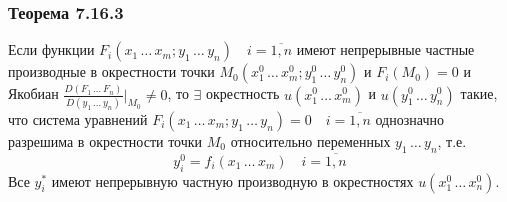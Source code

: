 \documentclass[12pt]{article}
\begin{document}
    \subsubsection*{Теорема 7.16.3}\label{th:7.16.3}
    Если функции $F_i(x_1\, \dots\, x_m; y_1\, \dots\, y_n) \quad i = \overline{1, n}$ имеют непрерывные частные производные в окрестности точки $M_0(x^0_1\, \dots\, x^0_m; y^0_1\, \dots\, y^0_n)$ и $F_i(M_0)=0$ и Якобиан $\frac{D(F_1\, \dots\, F_n)}{D(y_1\, \dots\, y_n)}\Big|_{M_0} \ne 0$, то $\exists$ окрестность $u(x^0_1\, \dots\, x^0_m)$ и $u(y^0_1\, \dots\, y^0_n)$ такие, что система уравнений $F_i(x_1\, \dots\, x_m; y_1\, \dots\, y_n) = 0 \quad i = \overline{1, n}$ однозначно разрешима в окрестности точки $M_0$ относительно переменных $y_1\, \dots\, y_n$, т.е. 
    \[ y^0_i = f_i(x_1\, \dots\, x_m) \quad i = \overline{1, n} \]
    Все $y^*_i$ имеют непрерывную частную производную в окрестностях $u(x^0_1\, \dots\, x^0_n)$.
\end{document}
